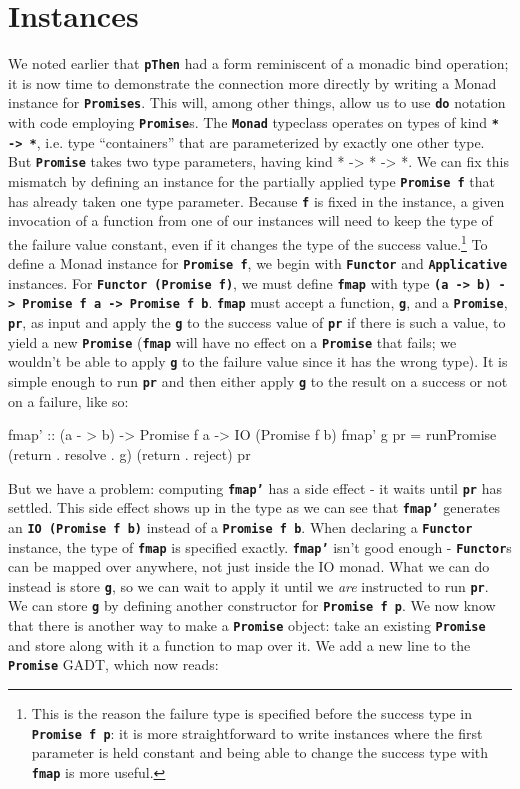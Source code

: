 \documentclass[12pt, english, letterpaper]{kuthesis}
\newcommand{\lit}[1]{\textbf{\texttt{#1}}}
\begin{document}
\section*{Instances}
We noted earlier that \lit{pThen} had a form reminiscent of a monadic bind operation; it is now time to demonstrate the connection more directly by writing a Monad instance for \lit{Promises}.  This will, among other things, allow us to use \lit{do} notation with code employing \lit{Promise}s.  The \lit{Monad} typeclass operates on types of kind \lit{* -> *}, i.e. type ``containers'' that are parameterized by exactly one other type.  But \lit{Promise} takes two type parameters, having kind {* -> * -> *}.  We can fix this mismatch by defining an instance for the partially applied type \lit{Promise f} that has already taken one type parameter.  Because \lit f is fixed in the instance, a given invocation of a function from one of our instances will need to keep the type of the failure value constant, even if it changes the type of the success value.\footnote{This is the reason the failure type is specified before the success type in \lit{Promise f p}: it is more straightforward to write instances where the first parameter is held constant and being able to change the success type with \lit{fmap} is more useful.}
To define a Monad instance for \lit{Promise f}, we begin with \lit{Functor} and \lit{Applicative} instances.  For \lit{Functor (Promise f)}, we must define \lit{fmap} with type \lit{(a -> b) -> Promise f a -> Promise f b}.  \lit{fmap} must accept a function, \lit g, and a \lit{Promise}, \lit{pr}, as input and apply the \lit g to the success value of \lit{pr} if there is such a value, to yield a new \lit{Promise} (\lit{fmap} will have no effect on a \lit{Promise} that fails; we wouldn't be able to apply \lit g to the failure value since it has the wrong type).  It is simple enough to run \lit{pr} and then either apply \lit g to the result on a success or not on a failure, like so:
\begin{code}
  fmap' :: (a - > b) -> Promise f a -> IO (Promise f b)
  fmap' g pr = runPromise (return . resolve . g) (return . reject) pr
\end{code}
But we have a problem: computing \lit{fmap'} has a side effect - it waits until \lit{pr} has settled.  This side effect shows up in the type as we can see that \lit{fmap'} generates an \lit{IO (Promise f b)} instead of a \lit{Promise f b}.  When declaring a \lit{Functor} instance, the type of \lit{fmap} is specified exactly.  \lit{fmap'} isn't good enough  - \lit{Functor}s can be mapped over anywhere, not just inside the IO monad.  What we can do instead is store \lit g, so we can wait to apply it until we \emph{are} instructed to run \lit{pr}.  We can store \lit g by defining another constructor for \lit{Promise f p}.  We now know that there is another way to make a \lit{Promise} object: take an existing \lit{Promise} and store along with it a function to map over it.  We add a new line to the \lit{Promise} GADT, which now reads:
\end{document}
